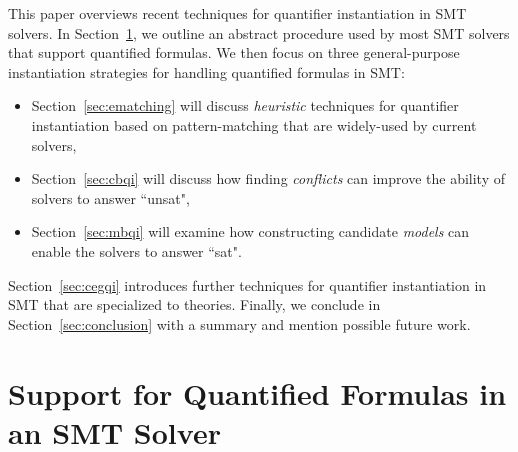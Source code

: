 \documentclass{easychair}
\begin{document}
This paper overviews recent techniques for quantifier instantiation in SMT solvers.
In Section~\ref{sec:quant}, we outline an abstract procedure used by most SMT solvers that support quantified formulas.
We then focus on three general-purpose instantiation strategies for handling quantified formulas in SMT:
\begin{itemize}
\item Section~\ref{sec:ematching} will discuss \emph{heuristic} techniques for quantifier instantiation based on pattern-matching that
are widely-used by current solvers,
\item Section~\ref{sec:cbqi} will discuss how finding \emph{conflicts} can improve the ability of solvers to answer ``unsat",
\item Section~\ref{sec:mbqi} will examine how constructing candidate \emph{models} can enable the solvers to answer ``sat".
\end{itemize} 
Section~\ref{sec:cegqi} introduces further techniques for quantifier instantiation in SMT that 
are specialized to theories.
Finally, we conclude in Section~\ref{sec:conclusion} with a summary and mention possible future work.

\section{Support for Quantified Formulas in an SMT Solver}
\label{sec:quant}
\end{document}
